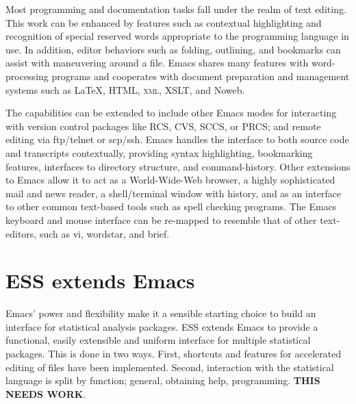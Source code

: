 \documentclass{article}
\begin{document}
Most programming and documentation tasks fall under the realm of text
editing.  This work can be enhanced by features such as contextual
highlighting and recognition of special reserved words appropriate to
the programming language in use.  In addition, editor behaviors such
as folding, outlining, and bookmarks can assist with maneuvering
around a file.  Emacs shares many features with word-processing
programs and cooperates with document preparation and management
systems such as \LaTeX, HTML, \textsc{xml}, XSLT, and Noweb.


The capabilities can be extended to include other Emacs modes for
interacting with version control packages like RCS, CVS, SCCS, or
PRCS; and remote editing via ftp/telnet or scp/ssh.  Emacs handles the
interface to both source code and transcripts contextually, providing
syntax highlighting, bookmarking features, interfaces to directory
structure, and command-history.  Other extensions to Emacs allow it to
act as a World-Wide-Web browser, a highly sophisticated mail and news
reader, a shell/terminal window with history, and as an interface to
other common text-based tools such as spell checking programs.  The
Emacs keyboard and mouse interface can be re-mapped to resemble that
of other text-editors, such as vi, wordstar, and brief.


\section{ESS extends Emacs}
\label{sec:ess-extends-emacs}

Emacs' power and flexibility make it a sensible starting choice to
build an interface for statistical analysis packages.  ESS extends
Emacs to provide a functional, easily extensible and uniform interface
for multiple statistical packages.  This is done in two ways.  First,
shortcuts and features for accelerated editing of files have been
implemented.  Second, interaction with the statistical
language is split by function; general, obtaining help, programming.
\textbf{THIS NEEDS WORK}.

\end{document}
